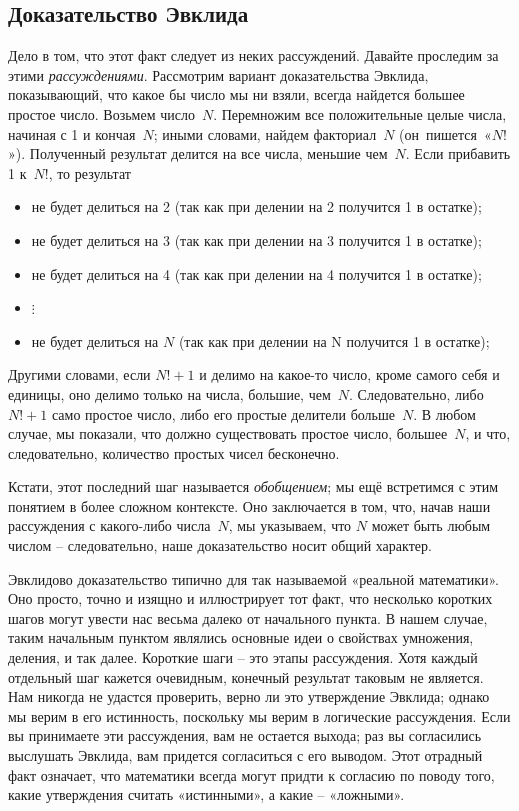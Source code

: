 \documentclass[../main.tex]{subfiles}
\begin{document}
\subsection{Доказательство Эвклида}

Дело в том, что этот факт следует из неких рассуждений.
Давайте проследим за этими \emph{рассуждениями}.
Рассмотрим вариант доказательства Эвклида, показывающий, что какое бы число мы ни взяли, всегда найдется большее простое число.
Возьмем число~$N$.
Перемножим все положительные целые числа, начиная с 1 и кончая~$N$; иными словами, найдем факториал~$N$ (он~пишется~«$N!$»).
Полученный результат делится на все числа, меньшие чем~$N$.
Если прибавить 1 к~$N!$, то результат

\begin{itemize}[label={}, noitemsep, topsep=6pt]
    \item не будет делиться на 2 (так как при делении на 2 получится 1 в остатке);
    \item не будет делиться на 3 (так как при делении на 3 получится 1 в остатке);
    \item не будет делиться на 4 (так как при делении на 4 получится 1 в остатке);
    \item $\vdots$
    \item не будет делиться на $N$ (так как при делении на N получится 1 в остатке);
\end{itemize}

Другими словами, если $N! + 1$ и делимо на какое-то число, кроме самого себя и единицы, оно делимо только на числа, большие, чем~$N$.
Следовательно, либо $N! + 1$ само простое число, либо его простые делители больше~$N$.
В любом случае, мы показали, что должно существовать простое число, большее~$N$, и что, следовательно, количество простых чисел бесконечно.

Кстати, этот последний шаг называется \emph{обобщением}; мы ещё встретимся с этим понятием в более сложном контексте.
Оно заключается в том, что, начав наши рассуждения с какого-либо числа~$N$, мы указываем, что $N$ может быть любым числом \--- следовательно, наше доказательство носит общий характер.

Эвклидово доказательство типично для так называемой «реальной математики». Оно просто, точно и изящно и иллюстрирует тот факт, что несколько коротких шагов могут увести нас весьма далеко от начального пункта. В нашем случае, таким начальным пунктом являлись основные идеи о свойствах умножения, деления, и так далее. Короткие шаги \--- это этапы рассуждения. Хотя каждый отдельный шаг кажется очевидным, конечный результат таковым не является. Нам никогда не удастся проверить, верно ли это утверждение Эвклида; однако мы верим в его истинность, поскольку мы верим в логические рассуждения. Если вы принимаете эти рассуждения, вам не остается выхода; раз вы согласились выслушать Эвклида, вам придется согласиться с его выводом. Этот отрадный факт означает, что математики всегда могут придти к согласию по поводу того, какие утверждения считать «истинными», а какие \--- «ложными».
\end{document}
